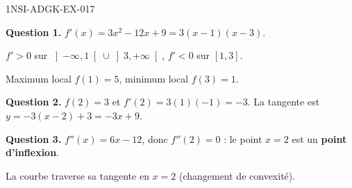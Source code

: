 \begin{corrige}{1NSI-ADGK-EX-017}

\textbf{Question 1.} $f'(x) = 3x^2 - 12x + 9 = 3(x-1)(x-3)$.


$f' > 0$ sur $\left]-\infty,1\right[ \cup \left]3,+\infty\right[$, $f' < 0$ sur $[1,3]$.

Maximum local $f(1) = 5$, minimum local $f(3) = 1$.

\textbf{Question 2.} $f(2) = 3$ et $f'(2) = 3(1)(-1) = -3$. La tangente est $y = -3(x-2)+3 = -3x+9$.

\textbf{Question 3.} $f''(x) = 6x - 12$, donc $f''(2) = 0$ : le point $x=2$ est un \textbf{point d'inflexion}.

La courbe traverse sa tangente en $x = 2$ (changement de convexité).

\end{corrige}
